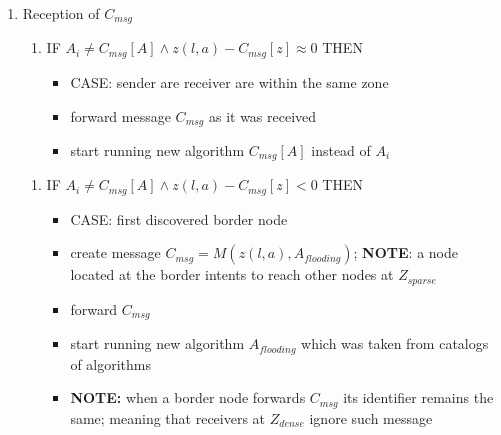 \begin{enumerate}
\item Reception of $C_{msg}$
	\begin{enumerate}
		\item IF $A_{i} \neq C_{msg}[A] \land z(l,a) - C_{msg}[z] \approx 0$ THEN
		\begin{itemize}
			\item CASE: sender are receiver are within the same zone
			\item forward message ${C_{msg}}$ as it was received
			\item start running new algorithm $C_{msg}[A]$ instead of $A_{i}$
		\end{itemize}
	\end{enumerate}
		\begin{enumerate}
		\item IF $A_{i} \neq C_{msg}[A] \land z(l,a) - C_{msg}[z] < 0$ THEN
		\begin{itemize}
			\item CASE: first discovered border node
			\item create message $C_{msg}=M(z(l, a), A_{flooding})$; \textbf{NOTE}: a node located at the border intents to reach other nodes at $Z_{sparse}$
			\item forward $C_{msg}$
			\item start running new algorithm $A_{flooding}$ which was taken from catalogs of algorithms
			\item \textbf{NOTE:} when a border node forwards $C_{msg}$ its identifier remains the same; meaning that receivers at $Z_{dense}$ ignore such message
		\end{itemize}
	\end{enumerate}

\end{enumerate}